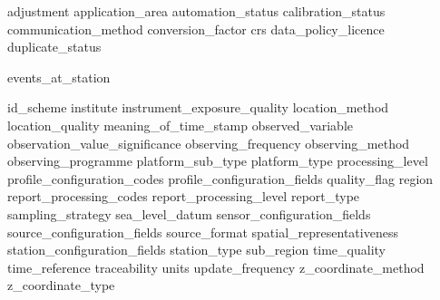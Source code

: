 \documentclass[a4paper]{article}
\begin{document}
 {adjustment}
 {application_area}
 {automation_status}
 {calibration_status}
 {communication_method}
 {conversion_factor}
 {crs}
 {data_policy_licence}
 {duplicate_status}

 {events_at_station}

 {id_scheme}
 {institute}
 {instrument_exposure_quality}
 {location_method}
 {location_quality}
 {meaning_of_time_stamp}
 {observed_variable}
 {observation_value_significance}
 {observing_frequency}
 {observing_method}
 {observing_programme}
 {platform_sub_type}
 {platform_type}
 {processing_level}
 {profile_configuration_codes}
 {profile_configuration_fields}
 {quality_flag}
 {region}
 {report_processing_codes}
 {report_processing_level}
 {report_type}
 {sampling_strategy}
 {sea_level_datum}
 {sensor_configuration_fields}
 {source_configuration_fields}
 {source_format}
 {spatial_representativeness}
 {station_configuration_fields}
 {station_type}
 {sub_region}
 {time_quality}
 {time_reference}
 {traceability}
 {units}
 {update_frequency}
 {z_coordinate_method}
 {z_coordinate_type}



\end{document}
